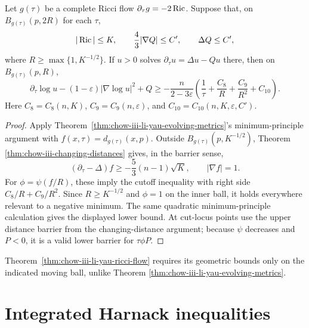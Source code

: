 \begin{theorem}
\label{thm:chow-iii-li-yau-ricci-flow}


Let \(g(\tau)\) be a complete Ricci flow
\(\partial_\tau g=-2\operatorname{Ric}\).  Suppose that, on
\(B_{g(\tau)}(p,2R)\) for each \(\tau\),
\[
 |\operatorname{Ric}|\leq K,\qquad \frac43|\nabla Q|\leq C',
 \qquad\Delta Q\leq C',
\]
where \(R\geq\max\{1,K^{-1/2}\}\).  If \(u>0\) solves
\(\partial_\tau u=\Delta u-Qu\) there, then on
\(B_{g(\tau)}(p,R)\),
\[
 \partial_\tau\log u-(1-\varepsilon)|\nabla\log u|^2+Q
 \geq-\frac{n}{2-3\varepsilon}
 \left(\frac1\tau+\frac{C_8}{R}+\frac{C_9}{R^2}+C_{10}\right).
\]
Here \(C_8=C_8(n,K)\), \(C_9=C_9(n,\varepsilon)\), and
\(C_{10}=C_{10}(n,K,\varepsilon,C')\).
\end{theorem}
\begin{proof}
\sketch Apply Theorem~\ref{thm:chow-iii-li-yau-evolving-metrics}'s
minimum-principle argument with \(f(x,\tau)=d_{g(\tau)}(x,p)\).  Outside
\(B_{g(\tau)}(p,K^{-1/2})\), Theorem
\ref{thm:chow-iii-changing-distances} gives, in the barrier sense,
\[
 (\partial_\tau-\Delta)f\geq-\frac53(n-1)\sqrt K,
 \qquad |\nabla f|=1.
\]
For \(\phi=\psi(f/R)\), these imply the cutoff inequality with right side
\(C_8/R+C_9/R^2\).  Since \(R\geq K^{-1/2}\) and \(\phi=1\) on the inner
ball, it holds everywhere relevant to a negative minimum.  The same
quadratic minimum-principle calculation gives the displayed lower bound.
At cut-locus points use the upper distance barrier from the changing-distance
argument; because \(\psi\) decreases and \(P<0\), it is a valid lower barrier
for \(\tau\phi P\).
\end{proof}

\begin{remark}
\label{rem:chow-iii-li-yau-locality-ricci-flow}

Theorem~\ref{thm:chow-iii-li-yau-ricci-flow} requires its geometric bounds
only on the indicated moving ball, unlike Theorem
\ref{thm:chow-iii-li-yau-evolving-metrics}.
\end{remark}

\section{Integrated Harnack inequalities}

